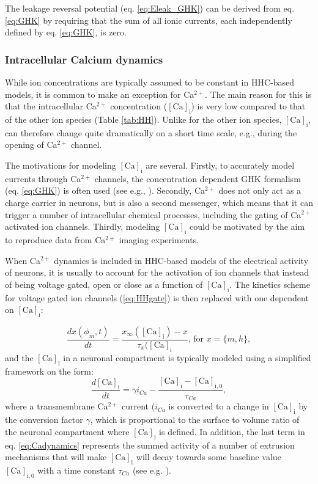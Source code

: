 The leakage reversal potential (eq. \ref{eq:Eleak_GHK}) can be derived from eq. \ref{eq:GHK} by requiring that the sum of all ionic currents, each independently defined by eq. \ref{eq:GHK}, is zero.


\subsubsection{Intracellular Calcium dynamics}
While ion concentrations are typically assumed to be constant in HHC-based models, it is common to make an exception for Ca$^{2+}$. The main reason for this is that the intracellular Ca$^{2+}$ concentration ($\mathrm{[Ca]_i}$) is very low compared to that of the other ion species (Table \ref{tab:HH}). Unlike for the other ion species,  $\mathrm{[Ca]_i}$, can therefore change quite dramatically on a short time scale, e.g., during the opening of Ca$^{2+}$ channel. 

The motivations for modeling $\mathrm{[Ca]_i}$ are several. Firstly, to accurately model currents through Ca$^{2+}$ channels, the concentration dependent GHK formalism (eq. \ref{eq:GHK}) is often used (see e.g., \cite{Destexhe1994, Zhu1999, Halnes2011}). Secondly, Ca$^{2+}$ does not only act as a charge carrier in neurons, but is also a second messenger, which means that it can trigger a number of intracellular chemical processes, including the gating of Ca$^{2+}$ activated ion channels. Thirdly, modeling $\mathrm{[Ca]_i}$ could be motivated by the aim to reproduce data from Ca$^{2+}$ imaging experiments. 

When Ca$^{2+}$ dynamics is included in HHC-based models of the electrical activity of neurons, it is usually to account for the activation of ion channels that instead of being voltage gated, open or close as a function of $\mathrm{[Ca]_i}$. The kinetics scheme for voltage gated ion channels (\ref{eq:HHgate}) is then replaced with one dependent on $\mathrm{[Ca]_i}$:

\begin{equation}
\frac{dx(\phi_m,t)}{dt} = \frac{x_{\infty}(\mathrm{[Ca]_i}) - x}{\tau_x(\mathrm{[Ca]_i}},  \, \text{for } x = \{m,h\},
\label{eq:Cagate}
\end{equation}
and the $\mathrm{[Ca]_i}$ in a neuronal compartment is typically modeled using a simplified framework on the form:
\begin{equation}
\frac{d\mathrm{[Ca]_i}}{dt} = \gamma i_{Ca} - \frac{\mathrm{[Ca]_i}-\mathrm{[Ca]_{i,0}}}{\tau_{Ca}}, 
\label{eq:Cadynamics}
\end{equation}
where a transmembrane Ca$^{2+}$ current ($i_{Ca}$ is converted to a change in $\mathrm{[Ca]_i}$ by the conversion factor $\gamma$, which is proportional to the surface to volume ratio of the neuronal compartment where $\mathrm{[Ca]_i}$ is defined. In addition, the last term in eq. \ref{eq:Cadynamics} represents the summed activity of a number of extrusion mechanisms that will make $\mathrm{[Ca]_i}$ will decay towards some baseline value $\mathrm{[Ca]_{i,0}}$ with a time constant $\tau_{Ca}$ (see e.g. \cite{Sterratt2011}).



